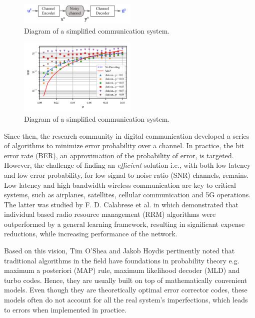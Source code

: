 \documentclass[conference]{IEEEtran}
\begin{document}
\begin{figure}[!ht]
  \centering
    \includegraphics[width=0.5\textwidth]{simple_sys}
    \caption{Diagram of a simplified communication system.}\label{fig:cs}
\end{figure}

\begin{figure}[!ht]
  \centering
    \includegraphics[width=0.5\textwidth]{images/test}
    \caption{Diagram of a simplified communication system.}\label{fig:cs}
\end{figure}


Since then, the research community in digital communication developed a series of algorithms to minimize error probability over a channel. In practice, the bit error rate (BER), an approximation of the probability of error, is targeted. However, the challenge of finding an \textit{efficient} solution  i.e., with both low latency and low error probability, for low signal to noise ratio (SNR) channels, remains. Low latency and high bandwidth wireless communication are key to critical systems, such as airplanes, satellites, cellular communication and 5G operations. The latter was studied by F. D. Calabrese et al. in \cite{b3} which  demonstrated that individual based radio resource management (RRM) algorithms were outperformed by a general learning framework, resulting in significant expense reductions, while increasing performance of the network.

Based on this vision, Tim O'Shea and Jakob Hoydis \cite{b2} pertinently noted that traditional algorithms in the field have foundations in probability theory e.g. maximum a posteriori (MAP) rule, maximum likelihood decoder (MLD) and turbo codes. Hence, they are usually built on top of mathematically convenient models. Even though they are theoretically optimal error corrector codes, these models often do not account for all the real system's imperfections, which leads to errors when implemented in practice.
\end{document}
